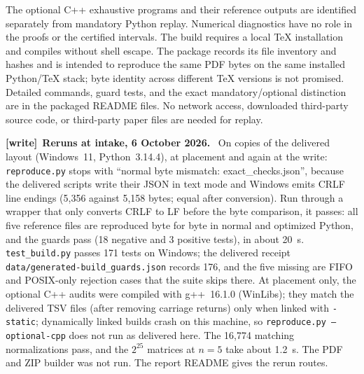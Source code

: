 \documentclass[11pt]{article}
\theoremstyle{definition}\newtheorem{definition}[theorem]{Definition}
\theoremstyle{remark}\newtheorem{remark}[theorem]{Remark}
\newcommand{\file}[1]{\nolinkurl{#1}}
\newenvironment{writenote}[1][]{\par\smallskip\begingroup\small
 \noindent\textbf{[write]}\if\relax\detokenize{#1}\relax\else~\textbf{#1.}\fi\ }%
 {\par\endgroup\smallskip}
\begin{document}
The optional C++ exhaustive programs and their reference outputs are identified separately from mandatory Python replay. Numerical diagnostics have no role in the proofs or the certified intervals. The build requires a local TeX installation and compiles without shell escape. The package records its file inventory and hashes and is intended to reproduce the same PDF bytes on the same installed Python/TeX stack; byte identity across different TeX versions is not promised. Detailed commands, guard tests, and the exact mandatory/optional distinction are in the packaged README files. No network access, downloaded third-party source code, or third-party paper files are needed for replay.

\begin{writenote}[Reruns at intake, 6 October 2026]
On copies of the delivered layout (Windows~11, Python~3.14.4), at placement
and again at the write: \file{reproduce.py} stops with ``normal byte
mismatch: exact\_checks.json'', because the delivered scripts write their
JSON in text mode and Windows emits CRLF line endings (5{,}356 against
5{,}158 bytes; equal after conversion). Run through a wrapper that only
converts CRLF to LF before the byte comparison, it passes: all five
reference files are reproduced byte for byte in normal and optimized
Python, and the guards pass (18 negative and 3 positive tests), in about
20~s. \file{test_build.py} passes 171 tests on Windows; the delivered
receipt \file{data/generated-build_guards.json} records 176, and the five
missing are FIFO and POSIX-only rejection cases that the suite skips there.
At placement only, the optional C++ audits were compiled with g++~16.1.0
(WinLibs); they match the
delivered TSV files (after removing carriage returns) only when linked with
\texttt{-static}; dynamically linked builds crash on this machine, so
\texttt{reproduce.py --optional-cpp} does not run as delivered here. The
16{,}774 matching normalizations pass, and the $2^{25}$ matrices at $n=5$
take about 1.2~s. The PDF and ZIP builder was not run. The report README
gives the rerun routes.
\end{writenote}
\end{document}
